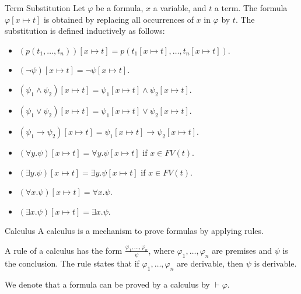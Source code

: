 \documentclass{beamer}
\begin{document}
  \begin{frame}{Term Substitution}
    Let $\varphi$ be a formula, $x$ a variable, and $t$ a term. The formula $\varphi[x\mapsto t]$ is obtained by replacing all occurrences of $x$ in $\varphi$ by $t$. The substitution is defined inductively as follows:
    \begin{itemize}
    \item $(p(t_1, \ldots, t_n))[x\mapsto t]=p(t_1[x\mapsto t], \ldots, t_n[x\mapsto t])$.
    \item $(\neg\psi)[x\mapsto t]=\neg\psi[x\mapsto t]$.
    \item $(\psi_1\wedge\psi_2)[x\mapsto t]=\psi_1[x\mapsto t]\wedge\psi_2[x\mapsto t]$.
    \item $(\psi_1\vee\psi_2)[x\mapsto t]=\psi_1[x\mapsto t]\vee\psi_2[x\mapsto t]$.
    \item $(\psi_1\rightarrow\psi_2)[x\mapsto t]=\psi_1[x\mapsto t]\rightarrow\psi_2[x\mapsto t]$.
    \item   $(\forall y.\psi)[x\mapsto t]=\forall y.\psi[x\mapsto t]$ if $x\in FV(t)$.
    \item $(\exists y.\psi)[x\mapsto t]=\exists y.\psi[x\mapsto t]$ if $x\in FV(t)$.
    \item $(\forall x.\psi)[x\mapsto t]=\forall x.\psi$.
    \item $(\exists x.\psi)[x\mapsto t]=\exists x.\psi$.
    \end{itemize}
  \end{frame}
    
  \begin{frame}{Calculus}
    A calculus is a mechanism to prove formulas by applying rules.

    A rule of a calculus has the form $\frac{\varphi_1, \ldots, \varphi_n}{\psi}$, where $\varphi_1, \ldots, \varphi_n$ are premises and $\psi$ is the conclusion. The rule states that if $\varphi_1, \ldots, \varphi_n$ are derivable, then $\psi$ is derivable.

    We denote that a formula can be proved by a calculus by $\vdash\varphi$.
  \end{frame}
\end{document}
